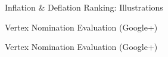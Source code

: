 \documentclass[xcolor=dvipsnames]{beamer}
\begin{document}
\begin{frame}{Inflation \& Deflation Ranking: Illustrations}
\begin{figure}
\end{figure}
\end{frame}

\begin{frame}{Vertex Nomination Evaluation (Google+)}
\begin{figure}
\end{figure}
\end{frame}

\begin{frame}{Vertex Nomination Evaluation (Google+)}
\begin{figure}
\end{figure}
\end{frame}
\end{document}
